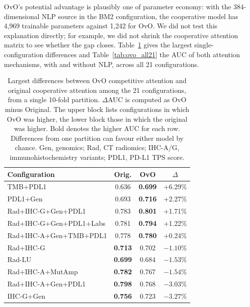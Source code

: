 OvO's potential advantage is plausibly one of parameter economy: with the 384-dimensional NLP source
in the BM2 configuration, the cooperative model has 4{,}969 trainable parameters against 1{,}242 for OvO.
We did not test this explanation directly; for example, we did not shrink the cooperative attention matrix
to see whether the gap closes.
Table~\ref{tab:ovo} gives the largest single-configuration differences and Table~\ref{tab:ovo_all21} the AUC
of both attention mechanisms, with and without NLP, across all 21 configurations.

\begin{table}[H]
\caption{Largest differences between OvO competitive attention and original cooperative attention among the
  21 configurations, from a single 10-fold partition.
  $\Delta$AUC is computed as OvO minus Original.
  The upper block lists configurations in which OvO was higher, the lower block those in which the original was higher.
  Bold denotes the higher AUC for each row.
  Differences from one partition can favour either model by chance.
  Gen, genomics; Rad, CT radiomics; IHC-A/G, immunohistochemistry variants;
  PDL1, PD-L1 TPS score.}
\label{tab:ovo}
\centering
\footnotesize
\begin{tabular}{@{}lccc@{}}
\toprule
Configuration & Orig. & OvO & $\Delta$ \\
\midrule
TMB+PDL1                & 0.636 & \textbf{0.699} & +6.29\% \\
PDL1+Gen                & 0.693 & \textbf{0.716} & +2.27\% \\
Rad+IHC-G+Gen+PDL1      & 0.783 & \textbf{0.801} & +1.71\% \\
Rad+IHC-G+Gen+PDL1+Labs & 0.781 & \textbf{0.794} & +1.22\% \\
Rad+IHC-A+Gen+TMB+PDL1  & 0.778 & \textbf{0.780} & +0.24\% \\
\midrule
Rad+IHC-G               & \textbf{0.713} & 0.702 & $-1.10\%$ \\
Rad-LU                  & \textbf{0.699} & 0.684 & $-1.53\%$ \\
Rad+IHC-A+MutAmp        & \textbf{0.782} & 0.767 & $-1.54\%$ \\
Rad+IHC-A+Gen+PDL1      & \textbf{0.798} & 0.768 & $-3.03\%$ \\
IHC-G+Gen               & \textbf{0.756} & 0.723 & $-3.27\%$ \\
\bottomrule
\end{tabular}
\end{table}



